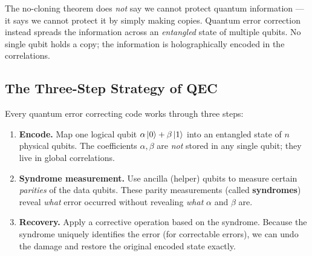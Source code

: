\documentclass[11pt, a4paper]{article}
\theoremstyle{definition}
\theoremstyle{plain}
\theoremstyle{remark}
\begin{document}
\begin{intuition}
The no-cloning theorem does \emph{not} say we cannot protect quantum
information --- it says we cannot protect it by simply making copies.
Quantum error correction instead spreads the information across an
\emph{entangled} state of multiple qubits.  No single qubit holds a copy;
the information is holographically encoded in the correlations.
\end{intuition}

\subsection{The Three-Step Strategy of QEC}

Every quantum error correcting code works through three steps:

\begin{enumerate}
  \item \textbf{Encode.}  Map one logical qubit
        $\alpha\ket{0} + \beta\ket{1}$ into an entangled state of $n$
        physical qubits.  The coefficients $\alpha, \beta$ are \emph{not}
        stored in any single qubit; they live in global correlations.

  \item \textbf{Syndrome measurement.}  Use ancilla (helper) qubits to
        measure certain \emph{parities} of the data qubits.  These parity
        measurements (called \textbf{syndromes}) reveal \emph{what} error
        occurred without revealing \emph{what} $\alpha$ and $\beta$ are.

  \item \textbf{Recovery.}  Apply a corrective operation based on the
        syndrome.  Because the syndrome uniquely identifies the error (for
        correctable errors), we can undo the damage and restore the original
        encoded state exactly.
\end{enumerate}
\end{document}
